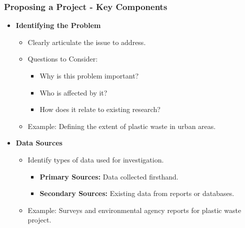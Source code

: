 \documentclass[aspectratio=169]{beamer}
\begin{document}
\begin{frame}[fragile]
    \frametitle{Proposing a Project - Key Components}
    \begin{itemize}
        \item \textbf{Identifying the Problem}
        \begin{itemize}
            \item Clearly articulate the issue to address.
            \item Questions to Consider:
            \begin{itemize}
                \item Why is this problem important?
                \item Who is affected by it?
                \item How does it relate to existing research?
            \end{itemize}
            \item Example: Defining the extent of plastic waste in urban areas.
        \end{itemize}

        \item \textbf{Data Sources}
        \begin{itemize}
            \item Identify types of data used for investigation.
            \begin{itemize}
                \item \textbf{Primary Sources:} Data collected firsthand.
                \item \textbf{Secondary Sources:} Existing data from reports or databases.
            \end{itemize}
            \item Example: Surveys and environmental agency reports for plastic waste project.
        \end{itemize}
    \end{itemize}
\end{frame}
\end{document}
